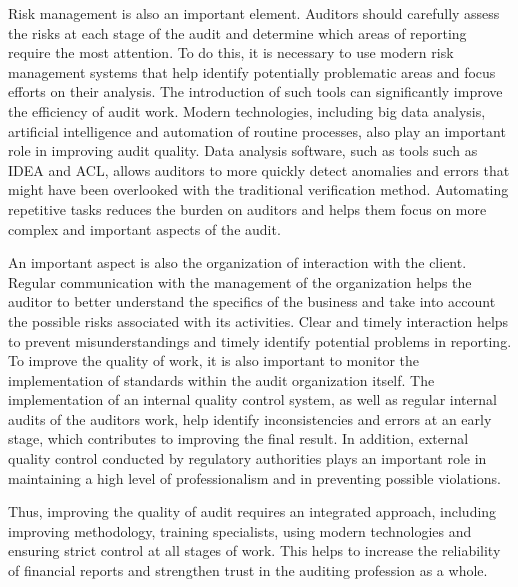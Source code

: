 Risk management is also an important element. Auditors should carefully
assess the risks at each stage of the audit and determine which areas of
reporting require the most attention. To do this, it is necessary to use
modern risk management systems that help identify potentially
problematic areas and focus efforts on their analysis. The introduction
of such tools can significantly improve the efficiency of audit work.
Modern technologies, including big data analysis, artificial
intelligence and automation of routine processes, also play an important
role in improving audit quality. Data analysis software, such as tools
such as IDEA and ACL, allows auditors to more quickly detect anomalies
and errors that might have been overlooked with the traditional
verification method. Automating repetitive tasks reduces the burden on
auditors and helps them focus on more complex and important aspects of
the audit.

An important aspect is also the organization of interaction with the
client. Regular communication with the management of the organization
helps the auditor to better understand the specifics of the business and
take into account the possible risks associated with its activities.
Clear and timely interaction helps to prevent misunderstandings and
timely identify potential problems in reporting. To improve the quality
of work, it is also important to monitor the implementation of standards
within the audit organization itself. The implementation of an internal
quality control system, as well as regular internal audits of the
auditors\textquotesingle{} work, help identify inconsistencies and
errors at an early stage, which contributes to improving the final
result. In addition, external quality control conducted by regulatory
authorities plays an important role in maintaining a high level of
professionalism and in preventing possible violations.

Thus, improving the quality of audit requires an integrated approach,
including improving methodology, training specialists, using modern
technologies and ensuring strict control at all stages of work. This
helps to increase the reliability of financial reports and strengthen
trust in the auditing profession as a whole.

